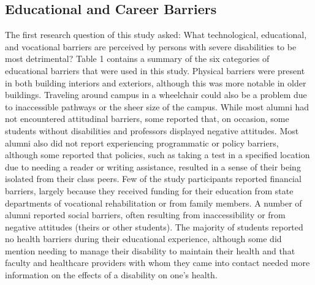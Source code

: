 \documentclass[11.5pt]{sig-alternate} %
\begin{document}
\begin{large}
\subsection*{Educational and Career Barriers}
The first research question of this study asked: What technological, educational, and vocational barriers are perceived by persons with severe disabilities to be most detrimental? Table 1 contains a summary of the six categories of educational barriers that were used in this study. Physical barriers were present in both building interiors and exteriors, although this was more notable in older buildings. Traveling around campus in a wheelchair could also be a problem due to inaccessible pathways or the sheer size of the campus. While most alumni had not encountered attitudinal barriers, some reported that, on occasion, some students without disabilities and professors displayed negative attitudes. Most alumni also did not report experiencing programmatic or policy barriers, although some reported that policies, such as taking a test in a specified location due to needing a reader or writing assistance, resulted in a sense of their being isolated from their class peers. Few of the study participants reported financial barriers, largely because they received funding for their education from state departments of vocational rehabilitation or from family members. A number of alumni reported social barriers, often resulting from inaccessibility or from negative attitudes (theirs or other students). The majority of students reported no health barriers during their educational experience, although some did mention needing to manage their disability to maintain their health and that faculty and healthcare providers with whom they came into contact needed more information on the effects of a disability on one's health.


\end{large}
\end{document}

